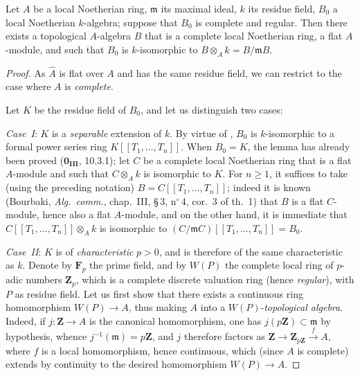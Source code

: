\begin{lemma}[19.7.1.3]
\label{0.19.7.1.3}
Let $A$ be a local Noetherian ring, $\mathfrak{m}$ its maximal ideal, $k$ its residue field, $B_0$ a local Noetherian $k$-algebra; suppose that $B_0$ is complete and regular.
Then there exists a topological $A$-algebra $B$ that is a complete local Noetherian ring, a flat $A$-module, and such that $B_0$ is $k$-isomorphic to $B\otimes_A k = B/\mathfrak{m}B$.
\end{lemma}

\begin{proof}
As $\widehat{A}$ is flat over $A$ and has the same residue field, we can restrict to the case where $A$ is \emph{complete}.

Let $K$ be the residue field of $B_0$, and let us distinguish two cases:

\medskip
\noindent\emph{Case~I}: $K$ is a \emph{separable} extension of $k$.
By virtue of , $B_0$ is $k$-isomorphic to a formal power series ring $K[[T_1,\ldots,T_n]]$.
When $B_0=K$, the lemma has already been proved ($\mathbf{0_{III}}$, 10.3.1); let $C$ be a complete local Noetherian ring that is a flat $A$-module and such that $C\otimes_A k$ is isomorphic to $K$.
For $n\geq 1$, it suffices to take (using the preceding notation) $B=C[[T_1,\ldots,T_n]]$; indeed it is known (Bourbaki, \emph{Alg.\ comm.}, chap.~III, \S\,3, n$^\circ$\,4, cor.~3 of th.~1) that $B$ is a flat $C$-module, hence also a flat $A$-module, and on the other hand, it is immediate that $C[[T_1,\ldots,T_n]]\otimes_A k$ is isomorphic to $(C/\mathfrak{m}C)[[T_1,\ldots,T_n]]=B_0$.

\medskip
\noindent\emph{Case~II}: $K$ is of \emph{characteristic} $p>0$, and is therefore of the same characteristic as $k$.
Denote by $\mathbf{F}_p$ the prime field, and by $W(P)$ the complete local ring of $p$-adic numbers $\mathbf{Z}_p$, which is a complete discrete valuation ring (hence \emph{regular}), with $P$ as residue field.
Let us first show that there exists a continuous ring homomorphism $W(P)\to A$, thus making $A$ into a $W(P)$-\emph{topological algebra}.
Indeed, if $j:\mathbf{Z}\to A$ is the canonical homomorphism, one has $j(p\mathbf{Z})\subset\mathfrak{m}$ by hypothesis, whence $j^{-1}(\mathfrak{m})=p\mathbf{Z}$, and $j$ therefore factors as $\mathbf{Z}\to\mathbf{Z}_{p\mathbf{Z}}\xrightarrow{f}A$, where $f$ is a local homomorphism, hence continuous, which (since $A$ is complete) extends by continuity to the desired homomorphism $W(P)\to A$.


\end{proof}
